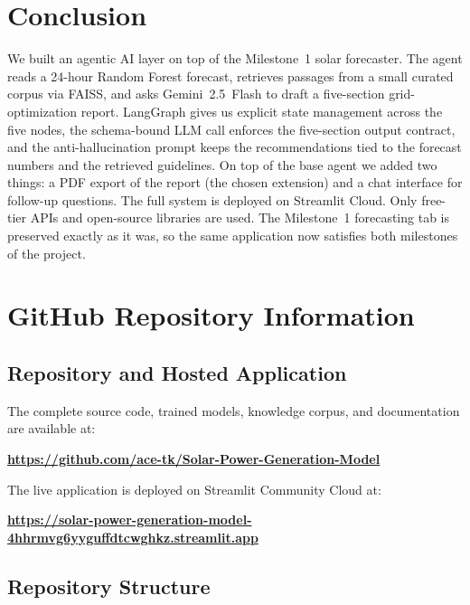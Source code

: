 \documentclass[journal,onecolumn,11pt]{IEEEtran}
\begin{document}
\section{Conclusion}

We built an agentic AI layer on top of the Milestone~1 solar forecaster. The agent reads a 24-hour Random Forest forecast, retrieves passages from a small curated corpus via FAISS, and asks Gemini~2.5~Flash to draft a five-section grid-optimization report. LangGraph gives us explicit state management across the five nodes, the schema-bound LLM call enforces the five-section output contract, and the anti-hallucination prompt keeps the recommendations tied to the forecast numbers and the retrieved guidelines. On top of the base agent we added two things: a PDF export of the report (the chosen extension) and a chat interface for follow-up questions. The full system is deployed on Streamlit Cloud. Only free-tier APIs and open-source libraries are used. The Milestone~1 forecasting tab is preserved exactly as it was, so the same application now satisfies both milestones of the project.




\appendix

\section{GitHub Repository Information}

\subsection{Repository and Hosted Application}
The complete source code, trained models, knowledge corpus, and documentation are available at:

\begin{center}
\textbf{\url{https://github.com/ace-tk/Solar-Power-Generation-Model}}
\end{center}

The live application is deployed on Streamlit Community Cloud at:

\begin{center}
\textbf{\url{https://solar-power-generation-model-4hhrmvg6yyguffdtcwghkz.streamlit.app}}
\end{center}

\subsection{Repository Structure}
\end{document}
